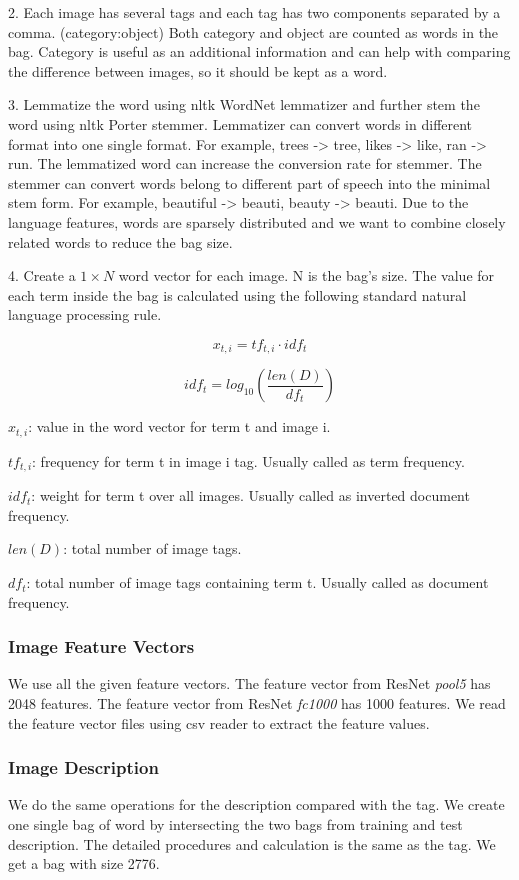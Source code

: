 \documentclass{article} %
\begin{document}
2. Each image has several tags and each tag has two components separated by a comma. (category:object) Both category and object are counted as words in the bag. Category is useful as an additional information and can help with comparing the difference between images, so it should be kept as a word.

3. Lemmatize the word using nltk WordNet lemmatizer and further stem the word using nltk Porter stemmer. Lemmatizer can convert words in different format into one single format. For example, trees -> tree, likes -> like, ran -> run. The lemmatized word can increase the conversion rate for stemmer. The stemmer can convert words belong to different part of speech into the minimal stem form. For example, beautiful -> beauti, beauty -> beauti. Due to the language features, words are sparsely distributed and we want to combine closely related words to reduce the bag size.

4. Create a $1 \times N$ word vector for each image. N is the bag's size. The value for each term inside the bag is calculated using the following standard natural language processing rule.

\[
x_{t,i} = tf_{t,i} \cdot idf_{t}
\]

\[
idf_{t} = log_{10}(\frac{len(D)}{df_{t}})
\]

$x_{t,i}$: value in the word vector for term t and image i.

$tf_{t,i}$: frequency for term t in image i tag. Usually called as term frequency.

$idf_{t}$: weight for term t over all images. Usually called as inverted document frequency.

$len(D)$: total number of image tags.

$df_{t}$: total number of image tags containing term t. Usually called as document frequency.

\subsubsection{Image Feature Vectors}
We use all the given feature vectors. The feature vector from ResNet \textit{pool5} has 2048 features. The feature vector from ResNet \textit{fc1000} has 1000 features. We read the feature vector files using csv reader to extract the feature values.

\subsubsection{Image Description}
We do the same operations for the description compared with the tag. We create one single bag of word by intersecting the two bags from training and test description. The detailed procedures and calculation is the same as the tag. We get a bag with size 2776.
\end{document}

